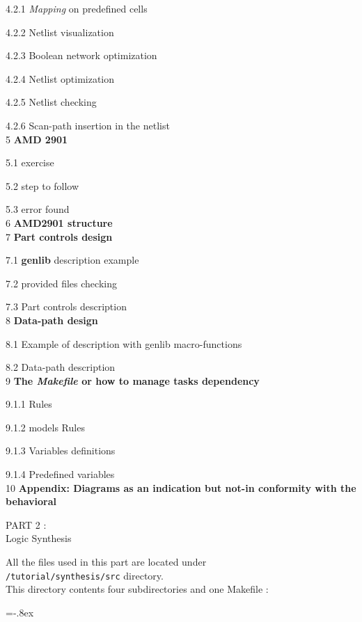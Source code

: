 \documentclass{article}
\begin{document}
{\hspace{0.5cm} {4.2.1} {\it Mapping} on predefined cells

\hspace{0.5cm} {4.2.2} Netlist visualization

\hspace{0.5cm} {4.2.3} Boolean network optimization

\hspace{0.5cm} {4.2.4} Netlist optimization 

\hspace{0.5cm} {4.2.5} Netlist checking

\hspace{0.5cm} {4.2.6} Scan-path insertion in the netlist
\\
 {5} {\bf AMD 2901}

 {5.1} exercise

 {5.2} step to follow

 {5.3} error found
\\
 {6} {\bf AMD2901 structure}
\\
 {7} {\bf Part controls design }

 {7.1}{ \bf genlib } description example 

 {7.2} provided files checking

 {7.3} Part controls description
\\
 {8} {\bf Data-path design}

 {8.1} Example of description with genlib macro-functions

 {8.2} Data-path description
\\
{9} {\bf The { \it Makefile } or how to manage tasks dependency }

 {9.1.1} Rules

 {9.1.2} models Rules

 {9.1.3} Variables definitions 

 {9.1.4} Predefined variables
\\
 {10} {\bf Appendix: Diagrams as an indication but not-in conformity with the behavioral}


\newpage
       {\huge
        PART 2 :\\ }
        \vspace{1cm}
        {\huge
        Logic Synthesis
        }

All the files used in this part are located under \\
\texttt{/tutorial/synthesis/src} directory.\\
This directory contents four subdirectories and one Makefile :
\begin{itemize}\itemsep=-.8ex


\end{itemize}}
\end{document}
